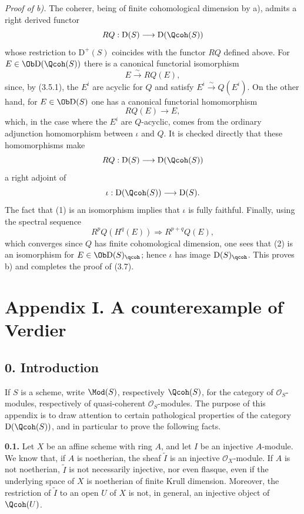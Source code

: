 \documentclass[11pt]{article}
\begin{document}
\emph{Proof of b).} The coherer, being of finite cohomological dimension by a), admits a right derived functor
\[
 RQ:\mathrm D(S)\longrightarrow\mathrm D(\Qcoh(S))
\]
whose restriction to $\mathrm D^+(S)$ coincides with the functor $RQ$ defined above. For $E\in\Ob\mathrm D(\Qcoh(S))$ there is a canonical functorial isomorphism
\begin{equation}\tag{1}
 E\xrightarrow{\sim}RQ(E),
\end{equation}
since, by (3.5.1), the $E^i$ are acyclic for $Q$ and satisfy $E^i\xrightarrow{\sim}Q(E^i)$. On the other hand, for $E\in\Ob\mathrm D(S)$ one has a canonical functorial homomorphism
\begin{equation}\tag{2}
 RQ(E)\longrightarrow E,
\end{equation}
which, in the case where the $E^i$ are $Q$-acyclic, comes from the ordinary adjunction homomorphism between $\iota$ and $Q$. It is checked directly that these homomorphisms make
\[
 RQ:\mathrm D(S)\longrightarrow\mathrm D(\Qcoh(S))
\]
a right adjoint of
\[
 \iota:\mathrm D(\Qcoh(S))\longrightarrow\mathrm D(S).
\]
The fact that (1) is an isomorphism implies that $\iota$ is fully faithful. Finally, using the spectral sequence
\[
 R^pQ(H^q(E))\Longrightarrow R^{p+q}Q(E),
\]
which converges since $Q$ has finite cohomological dimension, one sees that (2) is an isomorphism for $E\in\Ob\mathrm D(S)_{\qcoh}$; hence $\iota$ has image $\mathrm D(S)_{\qcoh}$. This proves b) and completes the proof of (3.7).

\section*{Appendix I. A counterexample of Verdier}

\subsection*{0. Introduction}
If $S$ is a scheme, write $\Mod(S)$, respectively $\Qcoh(S)$, for the category of $\mathcal O_S$-modules, respectively of quasi-coherent $\mathcal O_S$-modules. The purpose of this appendix is to draw attention to certain pathological properties of the category $\mathrm D(\Qcoh(S))$, and in particular to prove the following facts.

\textbf{0.1.} Let $X$ be an affine scheme with ring $A$, and let $I$ be an injective $A$-module. We know that, if $A$ is noetherian, the sheaf $\widetilde I$ is an injective $\mathcal O_X$-module. If $A$ is not noetherian, $\widetilde I$ is not necessarily injective, nor even flasque, even if the underlying space of $X$ is noetherian of finite Krull dimension. Moreover, the restriction of $\widetilde I$ to an open $U$ of $X$ is not, in general, an injective object of $\Qcoh(U)$.
\end{document}
